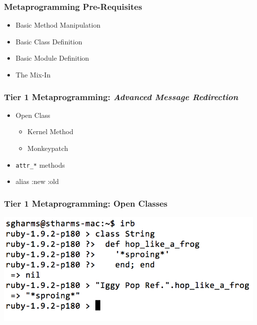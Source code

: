 \documentclass[slidestop,compress,mathserif]{beamer}
\begin{document}
\begin{frame}
	\frametitle{Metaprogramming Pre-Requisites}
	\begin{itemize}
		\item Basic Method Manipulation
		\item Basic Class Definition
		\item Basic Module Definition
		\item The Mix-In
	\end{itemize}
\end{frame}

\begin{frame}
	\frametitle{Tier 1 Metaprogramming: \emph{Advanced Message Redirection}}
	\begin{itemize}
		\item Open Class
			\begin{itemize}
				\item Kernel Method
				\item Monkeypatch
			\end{itemize}
		\item \texttt{attr\_*} methods
		\item alias :new :old
	\end{itemize}
	\vskip 0.5cm
\end{frame}


\begin{frame}
	\frametitle{Tier 1 Metaprogramming:  Open Classes}
		\includegraphics[scale=0.42]{img/open_class.png}
\end{frame}
\end{document}
